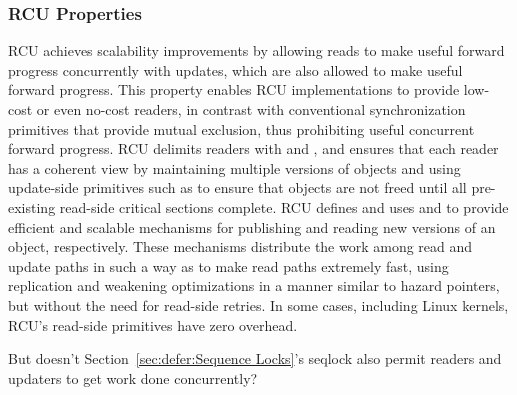 \subsubsection{RCU Properties}
\label{sec:defer:RCU Properties}

RCU achieves scalability
improvements by allowing reads to make useful forward progress
concurrently with updates, which are also allowed to make useful
forward progress.
This property enables RCU implementations to provide low-cost
or even no-cost readers,
in contrast with conventional synchronization primitives that
provide mutual exclusion, thus prohibiting useful concurrent forward
progress.
RCU delimits readers with  and ,
and ensures that each reader has a coherent view by
maintaining multiple versions of objects and using update-side primitives
such as  to ensure that objects are not
freed until all pre-existing read-side critical sections complete.
RCU defines and uses  and 
to provide efficient and scalable mechanisms for publishing
and reading new versions of an object, respectively.
These mechanisms distribute the work among read and
update paths in such a way as to make read paths extremely fast, using
replication and weakening optimizations in a manner similar to
hazard pointers, but without the need for read-side retries.
In some cases, including  Linux kernels,
RCU's read-side primitives have zero overhead.

\QuickQuiz{}
	But doesn't Section~\ref{sec:defer:Sequence Locks}'s seqlock
	also permit readers and updaters to get work done concurrently?
 \QuickQuizEnd

